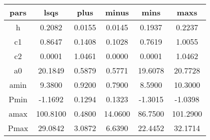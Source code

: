 \begin{table}
\begin{tabular}{cccccc}
\hline \hline
pars & lsqs & plus & minus & mins & maxs \\
\hline
h & 0.2082 & 0.0155 & 0.0145 & 0.1937 & 0.2237 \\
c1 & 0.8647 & 0.1408 & 0.1028 & 0.7619 & 1.0055 \\
c2 & 0.0001 & 1.0461 & 0.0000 & 0.0001 & 1.0462 \\
a0 & 20.1849 & 0.5879 & 0.5771 & 19.6078 & 20.7728 \\
amin & 9.3800 & 0.9200 & 0.7900 & 8.5900 & 10.3000 \\
Pmin & -1.1692 & 0.1294 & 0.1323 & -1.3015 & -1.0398 \\
amax & 100.8100 & 0.4800 & 14.0600 & 86.7500 & 101.2900 \\
Pmax & 29.0842 & 3.0872 & 6.6390 & 22.4452 & 32.1714 \\
\hline
\end{tabular}
\end{table}
